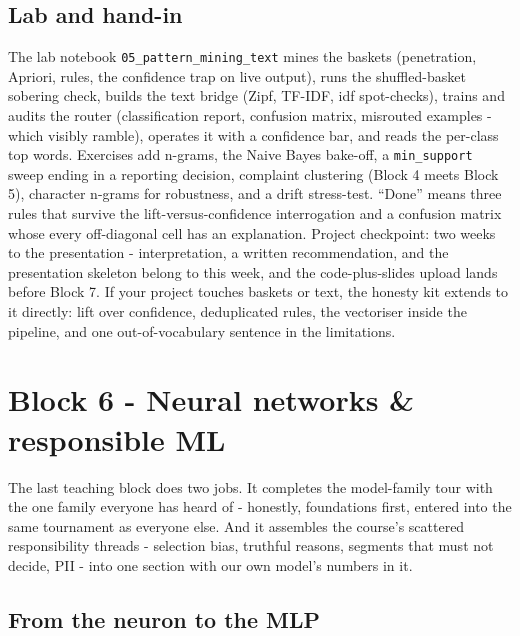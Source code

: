 \documentclass[11pt,a4paper]{article}
\begin{document}
\subsection{Lab and hand-in}
The lab notebook \texttt{05\_pattern\_mining\_text} mines the baskets
(penetration, Apriori, rules, the confidence trap on live output), runs
the shuffled-basket sobering check, builds the text bridge (Zipf, TF-IDF,
idf spot-checks), trains and audits the router (classification report,
confusion matrix, misrouted examples - which visibly ramble), operates
it with a confidence bar, and reads the per-class top words. Exercises add
n-grams, the Naive Bayes bake-off, a \texttt{min\_support} sweep ending in
a reporting decision, complaint clustering (Block 4 meets Block 5),
character n-grams for robustness, and a drift stress-test. ``Done'' means
three rules that survive the lift-versus-confidence interrogation and a
confusion matrix whose every off-diagonal cell has an explanation. Project
checkpoint: two weeks to the presentation - interpretation, a written
recommendation, and the presentation skeleton belong to this week, and the
code-plus-slides upload lands before Block 7. If your project touches
baskets or text, the honesty kit extends to it directly: lift over
confidence, deduplicated rules, the vectoriser inside the pipeline, and
one out-of-vocabulary sentence in the limitations.

\section{Block 6 - Neural networks \& responsible ML}

The last teaching block does two jobs. It completes the model-family tour
with the one family everyone has heard of - honestly, foundations first,
entered into the same tournament as everyone else. And it assembles the
course's scattered responsibility threads - selection bias, truthful
reasons, segments that must not decide, PII - into one section with our
own model's numbers in it.

\subsection{From the neuron to the MLP}
\end{document}
